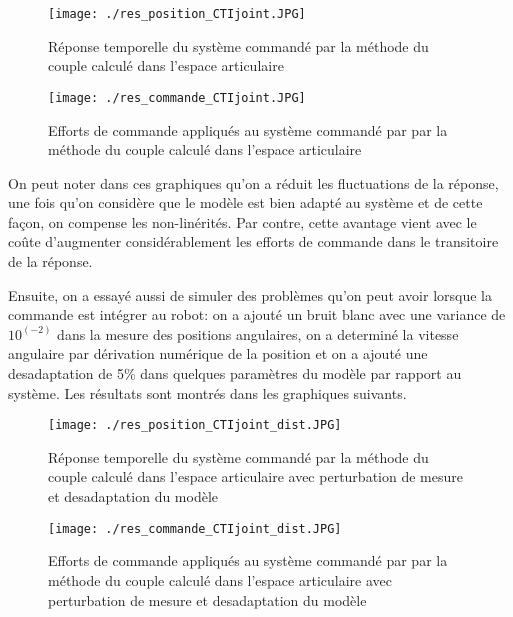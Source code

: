 \begin{figure}[H]
	\begin{center}
		\captionsetup{justification=centering,margin=1cm}	
		\texttt{[image: ./res\_position\_CTIjoint.JPG]}
		\caption{Réponse temporelle du système commandé par la méthode du couple calculé dans l'espace articulaire}
		\label{fig:CTI_joint_space_response}
	\end{center}
\end{figure}

\begin{figure}[H]
	\begin{center}	
		\captionsetup{justification=centering,margin=1cm}
		\texttt{[image: ./res\_commande\_CTIjoint.JPG]}
		\caption{Efforts de commande appliqués au système commandé par par la méthode du couple calculé dans l'espace articulaire}
		\label{fig:CTIgraphcont}
	\end{center}
\end{figure}

On peut noter dans ces graphiques qu'on a réduit les fluctuations de la réponse, une fois qu'on considère que le modèle est bien adapté au système et de cette façon, on compense les non-linérités. Par contre, cette avantage vient avec le coûte d'augmenter considérablement les efforts de commande dans le transitoire de la réponse.

Ensuite, on a essayé aussi de simuler des problèmes qu'on peut avoir lorsque la commande est intégrer au robot: on a ajouté un bruit blanc avec une variance de $ 10^(-2) $ dans la mesure des positions angulaires, on a determiné la vitesse angulaire par dérivation numérique de la position et on a ajouté une desadaptation de 5\% dans quelques paramètres du modèle par rapport au système. Les résultats sont montrés dans les graphiques suivants.

\begin{figure}[H]
	\begin{center}	
		\captionsetup{justification=centering,margin=1cm}
		\texttt{[image: ./res\_position\_CTIjoint\_dist.JPG]}
		\caption{Réponse temporelle du système commandé par la méthode du couple calculé dans l'espace articulaire avec perturbation de mesure et desadaptation du modèle}
		\label{fig:CTIdistpos}
	\end{center}
\end{figure}

\begin{figure}[H]
	\begin{center}	
		\captionsetup{justification=centering,margin=1cm}
		\texttt{[image: ./res\_commande\_CTIjoint\_dist.JPG]}
		\caption{Efforts de commande appliqués au système commandé par par la méthode du couple calculé dans l'espace articulaire avec perturbation de mesure et desadaptation du modèle}
		\label{fig:CTIdistcont}
	\end{center}
\end{figure}

